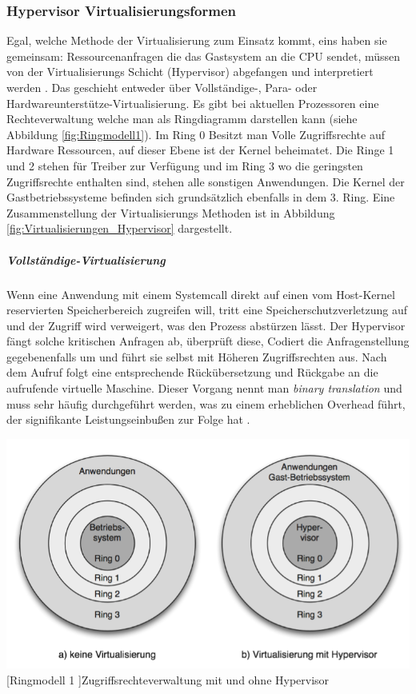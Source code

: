 \subsubsection{Hypervisor Virtualisierungsformen}
Egal, welche Methode der Virtualisierung zum Einsatz kommt, eins haben sie gemeinsam: Ressourcenanfragen die das Gastsystem an die CPU sendet, müssen von der Virtualisierungs Schicht (Hypervisor) abgefangen und interpretiert werden \cite{Meinel2011VirtualisierungMarktubersicht}. Das geschieht entweder über Vollständige-, Para- oder Hardwareunterstütze-Virtualisierung.  Es gibt bei aktuellen Prozessoren eine Rechteverwaltung welche man als Ringdiagramm darstellen kann (siehe Abbildung \ref{fig:Ringmodell1}). Im Ring 0 Besitzt man Volle Zugriffsrechte auf Hardware Ressourcen, auf dieser Ebene ist der Kernel beheimatet. Die Ringe 1 und 2 stehen für Treiber zur Verfügung und im Ring 3 wo die geringsten Zugriffsrechte enthalten sind, stehen alle sonstigen Anwendungen. Die Kernel der Gastbetriebssysteme befinden sich grundsätzlich ebenfalls in dem 3. Ring. Eine Zusammenstellung der Virtualisierungs Methoden ist in Abbildung \ref{fig:Virtualisierungen_Hypervisor} dargestellt.

\subparagraph{Vollständige-Virtualisierung}
 Wenn eine Anwendung mit einem Systemcall direkt auf einen vom Host-Kernel reservierten Speicherbereich zugreifen will, tritt eine Speicherschutzverletzung auf und der Zugriff wird verweigert, was den Prozess abstürzen lässt. Der Hypervisor fängt solche kritischen Anfragen ab, überprüft diese, Codiert die Anfragenstellung gegebenenfalls um und führt sie selbst mit Höheren Zugriffsrechten aus. Nach dem Aufruf folgt eine entsprechende Rückübersetzung und Rückgabe an die aufrufende virtuelle Maschine. Dieser Vorgang nennt man \glqq\emph{binary translation}\grqq{} und muss sehr häufig durchgeführt werden, was zu einem erheblichen Overhead führt, der signifikante Leistungseinbußen zur Folge hat \cite{Meinel2011VirtualisierungMarktubersicht}. 
 
 \vspace{1em}
\begin{minipage}{\linewidth}
	\centering
	\includegraphics[width=1\linewidth]{pics/Ringmodell1.PNG}
	[Ringmodell 1 ]{Zugriffsrechteverwaltung mit und ohne Hypervisor \cite{Meinel2011VirtualisierungMarktubersicht} }
	\label{fig:Ringmodell1}
\end{minipage}
 
